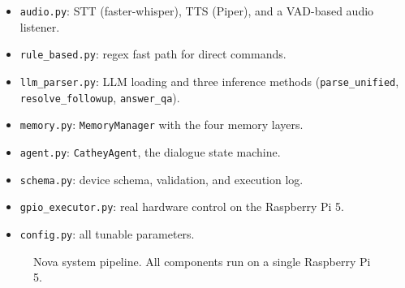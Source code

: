 \documentclass[conference]{IEEEtran}
\begin{document}
\begin{itemize}
    \item \texttt{audio.py}: STT (faster-whisper), TTS (Piper), and a VAD-based audio listener.
    \item \texttt{rule\_based.py}: regex fast path for direct commands.
    \item \texttt{llm\_parser.py}: LLM loading and three inference methods (\texttt{parse\_unified}, \texttt{resolve\_followup}, \texttt{answer\_qa}).
    \item \texttt{memory.py}: \texttt{MemoryManager} with the four memory layers.
    \item \texttt{agent.py}: \texttt{CatheyAgent}, the dialogue state machine.
    \item \texttt{schema.py}: device schema, validation, and execution log.
    \item \texttt{gpio\_executor.py}: real hardware control on the Raspberry Pi 5.
    \item \texttt{config.py}: all tunable parameters.
\end{itemize}

\begin{figure}[t]
\centering
{}
\caption{Nova system pipeline. All components run on a single Raspberry Pi 5.}
\label{fig:arch}
\end{figure}
\end{document}

